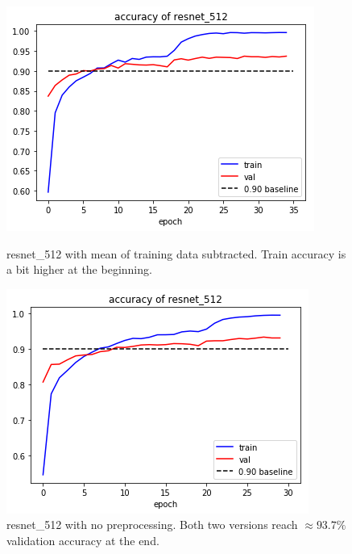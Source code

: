 \begin{figure}[!ht]
	\centering
	\begin{minipage}[t]{0.45\linewidth}
		\includegraphics[scale=0.5]{./figures/resnet512StMean}
		\caption{resnet\_512 with mean of training data subtracted. Train accuracy is a bit higher at the beginning.}
		\label{fig:resnet512StMean}
	\end{minipage}
	\centering
	\begin{minipage}[t]{0.45\linewidth}
		\includegraphics[scale=0.5]{./figures/accResnet512}
		\caption{resnet\_512 with no preprocessing. Both two versions reach $\approx 93.7\%$ validation accuracy at the end.}
		\label{fig:accResnet512}
	\end{minipage}
\end{figure}

